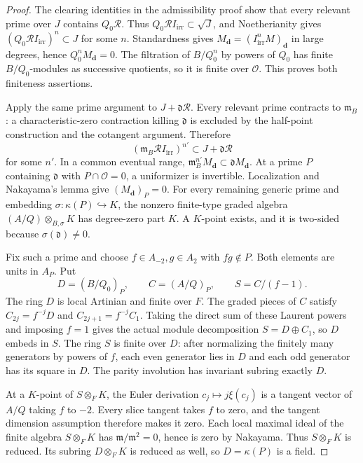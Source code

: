 \begin{proof}
The clearing identities in the admissibility proof show that every
relevant prime over $J$ contains $Q_0\mathcal R$. Thus
$Q_0\mathcal R I_{\mathrm{irr}}\subset\sqrt J$, and Noetherianity
gives $(Q_0\mathcal R I_{\mathrm{irr}})^n\subset J$ for some $n$.
Standardness gives
$M_{\boldsymbol d}=(I_{\mathrm{irr}}^nM)_{\boldsymbol d}$ in large
degrees, hence $Q_0^nM_{\boldsymbol d}=0$.
The filtration of $B/Q_0^n$ by powers of $Q_0$ has finite
$B/Q_0$-modules as successive quotients, so it is finite over
$\mathcal O$. This proves both finiteness assertions.

Apply the same prime argument to $J+\mathfrak d\mathcal R$.
Every relevant prime contracts to $\mathfrak m_B$: a
characteristic-zero contraction killing $\mathfrak d$ is excluded by
the half-point construction and the cotangent argument. Therefore
\[
 (\mathfrak m_B\mathcal R I_{\mathrm{irr}})^{n'}
 \subset J+\mathfrak d\mathcal R
\]
for some $n'$. In a common eventual range,
$\mathfrak m_B^{n'}M_{\boldsymbol d}\subset\mathfrak dM_{\boldsymbol d}$.
At a prime $P$ containing $\mathfrak d$ with $P\cap\mathcal O=0$,
a uniformizer is invertible. Localization and Nakayama's lemma give
$(M_{\boldsymbol d})_P=0$. For every remaining generic prime and
embedding $\sigma:\kappa(P)\hookrightarrow K$, the nonzero
finite-type graded algebra $(A/Q)\otimes_{B,\sigma}K$ has
degree-zero part $K$. A $K$-point exists, and it is two-sided because
$\sigma(\mathfrak d)\ne0$.

Fix such a prime and choose $f\in A_{-2},g\in A_2$ with
$fg\notin P$. Both elements are units in $A_P$. Put
\[
 D=(B/Q_0)_P,\qquad C=(A/Q)_P,\qquad S=C/(f-1).
\]
The ring $D$ is local Artinian and finite over $F$. The graded pieces
of $C$ satisfy $C_{2j}=f^{-j}D$ and $C_{2j+1}=f^{-j}C_1$.
Taking the direct sum of these Laurent powers and imposing $f=1$
gives the actual module decomposition $S=D\oplus C_1$, so $D$
embeds in $S$. The ring $S$ is finite over $D$: after normalizing the
finitely many generators by powers of $f$, each even generator lies
in $D$ and each odd generator has its square in $D$.
The parity involution has invariant subring exactly $D$.

At a $K$-point of $S\otimes_F K$, the Euler derivation
$c_j\mapsto j\xi(c_j)$ is a tangent vector of $A/Q$ taking $f$
to $-2$. Every slice tangent takes $f$ to zero, and the tangent
dimension assumption therefore makes it zero. Each local maximal
ideal of the finite algebra $S\otimes_F K$ has
$\mathfrak m/\mathfrak m^2=0$, hence is zero by Nakayama.
Thus $S\otimes_F K$ is reduced. Its subring $D\otimes_F K$ is
reduced as well, so $D=\kappa(P)$ is a field.


\end{proof}
